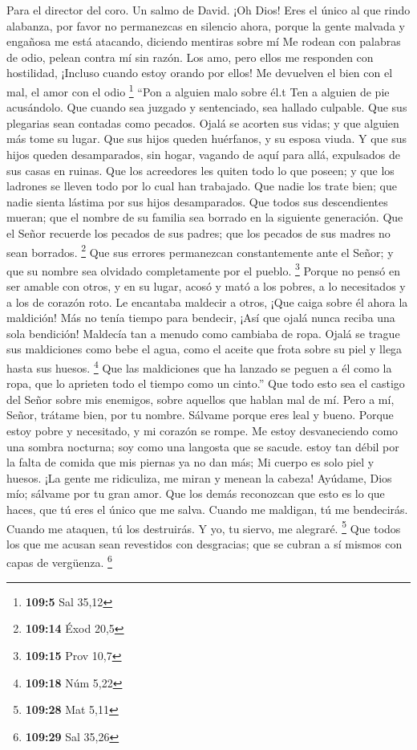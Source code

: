 Para el director del coro. Un salmo de David.  ¡Oh Dios!
Eres el único al que rindo alabanza, por favor no permanezcas en
silencio ahora,  porque la gente malvada y engañosa me está
atacando, diciendo mentiras sobre mí  Me rodean con palabras
de odio, pelean contra mí sin razón.  Los amo, pero ellos me
responden con hostilidad, ¡Incluso cuando estoy orando por ellos!
 Me devuelven el bien con el mal, el amor con el odio
\footnote{\textbf{109:5} Sal 35,12}  ``Pon a alguien malo
sobre él.t Ten a alguien de pie acusándolo.  Que cuando sea
juzgado y sentenciado, sea hallado culpable. Que sus plegarias sean
contadas como pecados.  Ojalá se acorten sus vidas; y que
alguien más tome su lugar.  Que sus hijos queden huérfanos,
y su esposa viuda.  Y que sus hijos queden desamparados,
sin hogar, vagando de aquí para allá, expulsados de sus casas en ruinas.
 Que los acreedores les quiten todo lo que poseen; y que
los ladrones se lleven todo por lo cual han trabajado.  Que
nadie los trate bien; que nadie sienta lástima por sus hijos
desamparados.  Que todos sus descendientes mueran; que el
nombre de su familia sea borrado en la siguiente generación.
 Que el Señor recuerde los pecados de sus padres; que los
pecados de sus madres no sean borrados. \footnote{\textbf{109:14} Éxod
  20,5}  Que sus errores permanezcan constantemente ante el
Señor; y que su nombre sea olvidado completamente por el pueblo.
\footnote{\textbf{109:15} Prov 10,7}  Porque no pensó en
ser amable con otros, y en su lugar, acosó y mató a los pobres, a lo
necesitados y a los de corazón roto.  Le encantaba maldecir
a otros, ¡Que caiga sobre él ahora la maldición! Más no tenía tiempo
para bendecir, ¡Así que ojalá nunca reciba una sola bendición!
 Maldecía tan a menudo como cambiaba de ropa. Ojalá se
trague sus maldiciones como bebe el agua, como el aceite que frota sobre
su piel y llega hasta sus huesos. \footnote{\textbf{109:18} Núm 5,22}
 Que las maldiciones que ha lanzado se peguen a él como la
ropa, que lo aprieten todo el tiempo como un cinto.''  Que
todo esto sea el castigo del Señor sobre mis enemigos, sobre aquellos
que hablan mal de mí.  Pero a mí, Señor, trátame bien, por
tu nombre. Sálvame porque eres leal y bueno.  Porque estoy
pobre y necesitado, y mi corazón se rompe.  Me estoy
desvaneciendo como una sombra nocturna; soy como una langosta que se
sacude.  estoy tan débil por la falta de comida que mis
piernas ya no dan más; Mi cuerpo es solo piel y huesos. 
¡La gente me ridiculiza, me miran y menean la cabeza! 
Ayúdame, Dios mío; sálvame por tu gran amor.  Que los demás
reconozcan que esto es lo que haces, que tú eres el único que me salva.
 Cuando me maldigan, tú me bendecirás. Cuando me ataquen,
tú los destruirás. Y yo, tu siervo, me alegraré. \footnote{\textbf{109:28}
  Mat 5,11}  Que todos los que me acusan sean revestidos
con desgracias; que se cubran a sí mismos con capas de vergüenza.
\footnote{\textbf{109:29} Sal 35,26}

